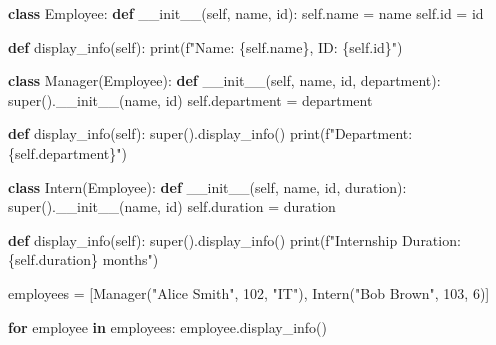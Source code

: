 \documentclass[
  letterpaper,
  DIV=11,
  numbers=noendperiod]{scrreprt}
\newenvironment{Shaded}{\begin{snugshade}}{\end{snugshade}}
\newcommand{\BuiltInTok}[1]{\textcolor[rgb]{0.00,0.23,0.31}{#1}}
\newcommand{\ControlFlowTok}[1]{\textcolor[rgb]{0.00,0.23,0.31}{\textbf{#1}}}
\newcommand{\DecValTok}[1]{\textcolor[rgb]{0.68,0.00,0.00}{#1}}
\newcommand{\FunctionTok}[1]{\textcolor[rgb]{0.28,0.35,0.67}{#1}}
\newcommand{\KeywordTok}[1]{\textcolor[rgb]{0.00,0.23,0.31}{\textbf{#1}}}
\newcommand{\NormalTok}[1]{\textcolor[rgb]{0.00,0.23,0.31}{#1}}
\newcommand{\OperatorTok}[1]{\textcolor[rgb]{0.37,0.37,0.37}{#1}}
\newcommand{\SpecialCharTok}[1]{\textcolor[rgb]{0.37,0.37,0.37}{#1}}
\newcommand{\SpecialStringTok}[1]{\textcolor[rgb]{0.13,0.47,0.30}{#1}}
\newcommand{\StringTok}[1]{\textcolor[rgb]{0.13,0.47,0.30}{#1}}
\newcommand{\VariableTok}[1]{\textcolor[rgb]{0.07,0.07,0.07}{#1}}
\begin{document}
\begin{Shaded}
\begin{Highlighting}[]
\KeywordTok{class}\NormalTok{ Employee:}
    \KeywordTok{def} \FunctionTok{\_\_init\_\_}\NormalTok{(}\VariableTok{self}\NormalTok{, name, }\BuiltInTok{id}\NormalTok{):}
        \VariableTok{self}\NormalTok{.name }\OperatorTok{=}\NormalTok{ name}
        \VariableTok{self}\NormalTok{.}\BuiltInTok{id} \OperatorTok{=} \BuiltInTok{id}
    
    \KeywordTok{def}\NormalTok{ display\_info(}\VariableTok{self}\NormalTok{):}
        \BuiltInTok{print}\NormalTok{(}\SpecialStringTok{f"Name: }\SpecialCharTok{\{}\VariableTok{self}\SpecialCharTok{.}\NormalTok{name}\SpecialCharTok{\}}\SpecialStringTok{, ID: }\SpecialCharTok{\{}\VariableTok{self}\SpecialCharTok{.}\BuiltInTok{id}\SpecialCharTok{\}}\SpecialStringTok{"}\NormalTok{)}

\KeywordTok{class}\NormalTok{ Manager(Employee):}
    \KeywordTok{def} \FunctionTok{\_\_init\_\_}\NormalTok{(}\VariableTok{self}\NormalTok{, name, }\BuiltInTok{id}\NormalTok{, department):}
        \BuiltInTok{super}\NormalTok{().}\FunctionTok{\_\_init\_\_}\NormalTok{(name, }\BuiltInTok{id}\NormalTok{)}
        \VariableTok{self}\NormalTok{.department }\OperatorTok{=}\NormalTok{ department}
    
    \KeywordTok{def}\NormalTok{ display\_info(}\VariableTok{self}\NormalTok{):}
        \BuiltInTok{super}\NormalTok{().display\_info()}
        \BuiltInTok{print}\NormalTok{(}\SpecialStringTok{f"Department: }\SpecialCharTok{\{}\VariableTok{self}\SpecialCharTok{.}\NormalTok{department}\SpecialCharTok{\}}\SpecialStringTok{"}\NormalTok{)}

\KeywordTok{class}\NormalTok{ Intern(Employee):}
    \KeywordTok{def} \FunctionTok{\_\_init\_\_}\NormalTok{(}\VariableTok{self}\NormalTok{, name, }\BuiltInTok{id}\NormalTok{, duration):}
        \BuiltInTok{super}\NormalTok{().}\FunctionTok{\_\_init\_\_}\NormalTok{(name, }\BuiltInTok{id}\NormalTok{)}
        \VariableTok{self}\NormalTok{.duration }\OperatorTok{=}\NormalTok{ duration}
    
    \KeywordTok{def}\NormalTok{ display\_info(}\VariableTok{self}\NormalTok{):}
        \BuiltInTok{super}\NormalTok{().display\_info()}
        \BuiltInTok{print}\NormalTok{(}\SpecialStringTok{f"Internship Duration: }\SpecialCharTok{\{}\VariableTok{self}\SpecialCharTok{.}\NormalTok{duration}\SpecialCharTok{\}}\SpecialStringTok{ months"}\NormalTok{)}

\NormalTok{employees }\OperatorTok{=}\NormalTok{ [Manager(}\StringTok{"Alice Smith"}\NormalTok{, }\DecValTok{102}\NormalTok{, }\StringTok{"IT"}\NormalTok{), Intern(}\StringTok{"Bob Brown"}\NormalTok{, }\DecValTok{103}\NormalTok{, }\DecValTok{6}\NormalTok{)]}

\ControlFlowTok{for}\NormalTok{ employee }\KeywordTok{in}\NormalTok{ employees:}
\NormalTok{    employee.display\_info()}
\end{Highlighting}
\end{Shaded}
\end{document}
